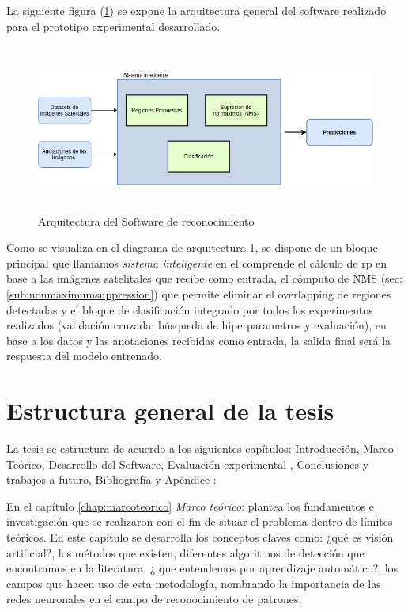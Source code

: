 La siguiente figura (\ref{Fig: diagbloque}) se expone la arquitectura general del software realizado para el prototipo experimental desarrollado. 

\begin{figure}[H]
 \centering
  \includegraphics[height=5.5cm,keepaspectratio=true,clip=true]{imagenes/Logos/DB-Sistema.png}
  \caption{Arquitectura del Software de reconocimiento}
	\label{Fig: diagbloque}
 \end{figure}
 
Como se visualiza en el diagrama de arquitectura \ref{Fig: diagbloque}, se dispone de un bloque principal que llamamos \textit{sistema inteligente} en el comprende el cálculo de \ac{rp} en base a las imágenes satelitales que recibe como entrada, el cómputo de NMS (sec: \ref{sub:nonmaximumsuppression}) que permite eliminar el overlapping de regiones detectadas y el bloque de clasificación integrado por todos los experimentos realizados (validación cruzada, búsqueda de hiperparametros y evaluación), en base a los datos y las anotaciones recibidas como entrada, la salida final será la respuesta del modelo entrenado.

\section{Estructura general de la tesis }\label{sec:estructura}


La tesis se estructura de acuerdo a los siguientes capítulos: Introducción, Marco Teórico, Desarrollo del Software, Evaluación experimental , Conclusiones y trabajos a futuro, Bibliografía y Apéndice :

En el capítulo \ref{chap:marcoteorico} \textit{Marco teórico}: plantea los fundamentos e investigación que se realizaron con el fin de situar el problema dentro de límites teóricos. En este capítulo se desarrolla los conceptos claves como: ¿qué es visión artificial?, los métodos que existen, diferentes algoritmos de detección que encontramos en la literatura, ¿ que entendemos por aprendizaje automático?, los campos que hacen uso de esta metodología, nombrando la importancia de las redes neuronales en el campo de reconocimiento de patrones.

